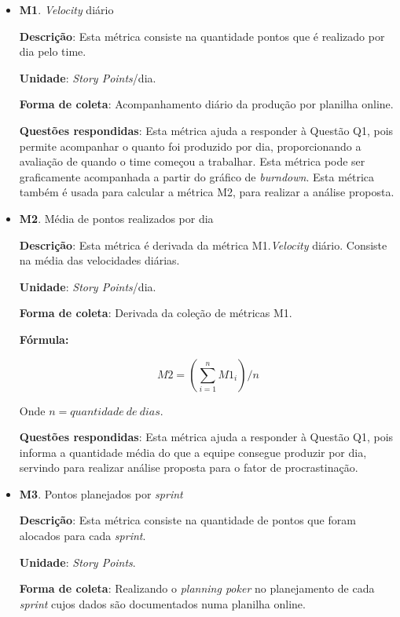 	\begin{itemize}

	 \item \textbf{M1}. \textit{Velocity} diário

	   \subitem \textbf{Descrição}: Esta métrica consiste na quantidade pontos que é realizado por dia pelo time.

	   \subitem \textbf{Unidade}: \textit{Story Points}/dia.

	   \subitem \textbf{Forma de coleta}: Acompanhamento diário da produção por planilha online.

	   \subitem \textbf{Questões respondidas}: Esta métrica ajuda a responder à Questão Q1, pois permite acompanhar o quanto
		    foi produzido por dia, proporcionando a avaliação de quando o time começou a trabalhar. Esta métrica pode ser
		    graficamente acompanhada a partir do gráfico de \textit{burndown}. Esta métrica também é usada para calcular a
		    métrica M2, para realizar a análise proposta.

	 \item \textbf{M2}. Média de pontos realizados por dia

	   \subitem \textbf{Descrição}: Esta métrica é derivada da métrica M1.\textit{Velocity} diário. Consiste na média das velocidades
		    diárias.

	   \subitem \textbf{Unidade}: \textit{Story Points}/dia.

	   \subitem \textbf{Forma de coleta}: Derivada da coleção de métricas M1.

	      \subsubitem \textbf{Fórmula:}

		$$ M2 = (\sum\limits_{i=1}^{n}M1_i)/n $$

	      \subsubitem Onde $n = quantidade\ de\ dias$.

	   \subitem \textbf{Questões respondidas}: Esta métrica ajuda a responder à Questão Q1, pois informa a quantidade média do
		    que a equipe consegue produzir por dia, servindo para realizar análise proposta para o fator de procrastinação.

	 \item \textbf{M3}. Pontos planejados por \textit{sprint}

	   \subitem \textbf{Descrição}: Esta métrica consiste na quantidade de pontos que foram alocados para cada \textit{sprint}.

	   \subitem \textbf{Unidade}: \textit{Story Points}.

	   \subitem \textbf{Forma de coleta}: Realizando o \textit{planning poker} no planejamento de cada \textit{sprint}
		    cujos dados são documentados numa planilha online.


\end{itemize}
